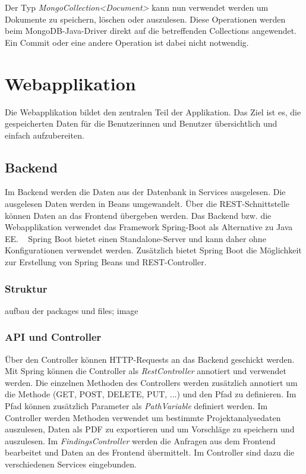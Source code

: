 Der Typ \textit{MongoCollection<Document>} kann nun verwendet werden um Dokumente zu speichern, löschen oder auszulesen. Diese Operationen werden beim MongoDB-Java-Driver direkt auf die betreffenden Collections angewendet. Ein Commit oder eine andere Operation ist dabei nicht notwendig.


\section{Webapplikation} 
Die Webapplikation bildet den zentralen Teil der Applikation. Das Ziel ist es, die gespeicherten Daten für die Benutzerinnen und Benutzer übersichtlich und einfach aufzubereiten. 
\subsection{Backend}
Im Backend werden die Daten aus der Datenbank in Services ausgelesen. Die ausgelesen Daten werden in Beans umgewandelt. Über die REST-Schnittstelle können Daten an das Frontend übergeben werden. Das Backend bzw. die Webapplikation verwendet das Framework Spring-Boot als Alternative zu Java EE. ~\parencite{walls2016spring} Spring Boot bietet einen Standalone-Server und kann daher ohne Konfigurationen verwendet werden. Zusätzlich bietet Spring Boot die Möglichkeit zur Erstellung von Spring Beans und REST-Controller.  

\subsubsection{Struktur}
aufbau der packages und files; image
\subsubsection{API und Controller}
Über den Controller können HTTP-Requests an das Backend geschickt werden. Mit Spring können die Controller als \textit{RestController} annotiert und verwendet werden. Die einzelnen Methoden des Controllers werden zusätzlich annotiert um die Methode (GET, POST, DELETE, PUT, ...) und den Pfad zu definieren. Im Pfad können zusätzlich Parameter als \textit{PathVariable} definiert werden. Im Controller werden  Methoden verwendet um bestimmte Projektanalysedaten auszulesen, Daten als PDF zu exportieren und um Vorschläge zu speichern und auszulesen. Im \textit{FindingsController} werden die Anfragen aus dem Frontend bearbeitet und Daten an des Frontend übermittelt. Im Controller sind dazu die verschiedenen Services eingebunden.

